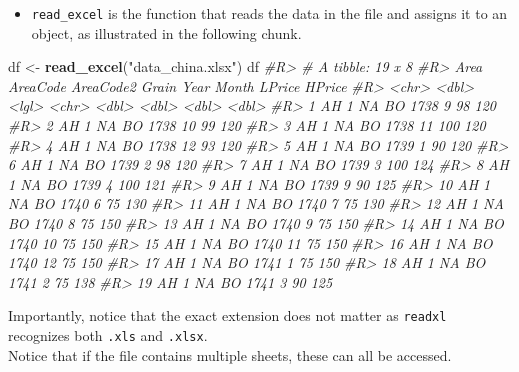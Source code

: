 \documentclass[]{book}
\newenvironment{Shaded}{}{}
\newcommand{\CommentTok}[1]{\textcolor[rgb]{0.38,0.63,0.69}{\textit{#1}}}
\newcommand{\KeywordTok}[1]{\textcolor[rgb]{0.00,0.44,0.13}{\textbf{#1}}}
\newcommand{\NormalTok}[1]{#1}
\newcommand{\StringTok}[1]{\textcolor[rgb]{0.25,0.44,0.63}{#1}}
\providecommand{\tightlist}{%
  \setlength{\itemsep}{0pt}\setlength{\parskip}{0pt}}
\theoremstyle{definition}
\theoremstyle{definition}
\theoremstyle{definition}
\theoremstyle{remark}
\begin{document}
\begin{itemize}
\tightlist
\item
  \texttt{read\_excel} is the function that reads the data in the file
  and assigns it to an object, as illustrated in the following chunk.
\end{itemize}

\begin{Shaded}
\begin{Highlighting}[]
\NormalTok{df <-}\StringTok{ }\KeywordTok{read_excel}\NormalTok{(}\StringTok{"data_china.xlsx"}\NormalTok{)}
\NormalTok{df }
\CommentTok{#R> # A tibble: 19 x 8}
\CommentTok{#R>    Area  AreaCode AreaCode2 Grain  Year Month LPrice HPrice}
\CommentTok{#R>    <chr>    <dbl> <lgl>     <chr> <dbl> <dbl>  <dbl>  <dbl>}
\CommentTok{#R>  1 AH           1 NA        BO     1738     9     98    120}
\CommentTok{#R>  2 AH           1 NA        BO     1738    10     99    120}
\CommentTok{#R>  3 AH           1 NA        BO     1738    11    100    120}
\CommentTok{#R>  4 AH           1 NA        BO     1738    12     93    120}
\CommentTok{#R>  5 AH           1 NA        BO     1739     1     90    120}
\CommentTok{#R>  6 AH           1 NA        BO     1739     2     98    120}
\CommentTok{#R>  7 AH           1 NA        BO     1739     3    100    124}
\CommentTok{#R>  8 AH           1 NA        BO     1739     4    100    121}
\CommentTok{#R>  9 AH           1 NA        BO     1739     9     90    125}
\CommentTok{#R> 10 AH           1 NA        BO     1740     6     75    130}
\CommentTok{#R> 11 AH           1 NA        BO     1740     7     75    130}
\CommentTok{#R> 12 AH           1 NA        BO     1740     8     75    150}
\CommentTok{#R> 13 AH           1 NA        BO     1740     9     75    150}
\CommentTok{#R> 14 AH           1 NA        BO     1740    10     75    150}
\CommentTok{#R> 15 AH           1 NA        BO     1740    11     75    150}
\CommentTok{#R> 16 AH           1 NA        BO     1740    12     75    150}
\CommentTok{#R> 17 AH           1 NA        BO     1741     1     75    150}
\CommentTok{#R> 18 AH           1 NA        BO     1741     2     75    138}
\CommentTok{#R> 19 AH           1 NA        BO     1741     3     90    125}
\end{Highlighting}
\end{Shaded}

Importantly, notice that the exact extension does not matter as
\texttt{readxl} recognizes both \texttt{.xls} and \texttt{.xlsx}.\\
Notice that if the file contains multiple sheets, these can all be
accessed.
\end{document}
